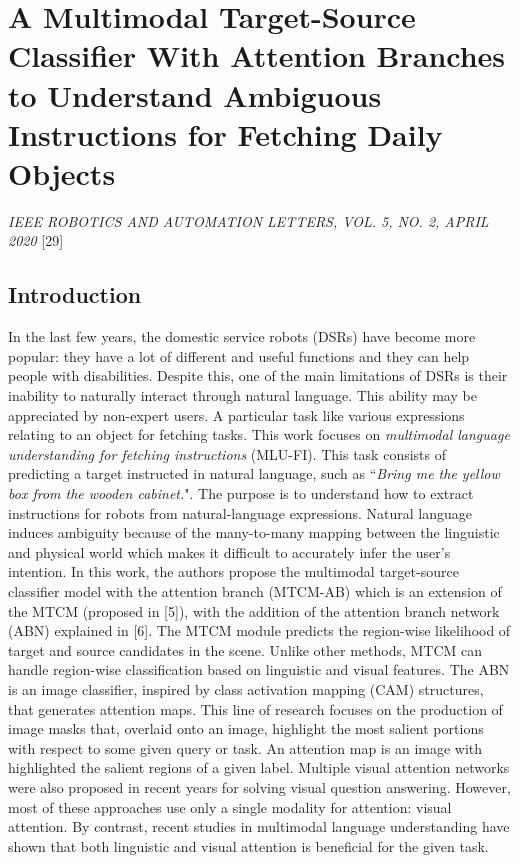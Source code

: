 \section{A Multimodal Target-Source Classifier With Attention Branches
to Understand Ambiguous Instructions for Fetching Daily
Objects}\label{header-n258}

\emph{IEEE ROBOTICS AND AUTOMATION LETTERS, VOL. 5, NO. 2, APRIL 2020}
{[}29{]}

\subsection{Introduction}\label{header-n260}

In the last few years, the domestic service robots (DSRs) have become
more popular: they have a lot of different and useful functions and they
can help people with disabilities. Despite this, one of the main
limitations of DSRs is their inability to naturally interact through
natural language. This ability may be appreciated by non-expert users. A
particular task like various expressions relating to an object for
fetching tasks. This work focuses on \emph{multimodal language
understanding for fetching instructions} (MLU-FI). This task consists of
predicting a target instructed in natural language, such as ``\emph{Bring
me the yellow box from the wooden cabinet.}". The purpose is to
understand how to extract instructions for robots from natural-language
expressions. Natural language induces ambiguity because of the
many-to-many mapping between the linguistic and physical world which
makes it difficult to accurately infer the user's intention. In this
work, the authors propose the multimodal target-source classifier model
with the attention branch (MTCM-AB) which is an extension of the MTCM
(proposed in {[}5{]}), with the addition of the attention branch network
(ABN) explained in {[}6{]}. The MTCM module predicts the region-wise
likelihood of target and source candidates in the scene. Unlike other
methods, MTCM can handle region-wise classification based on linguistic
and visual features. The ABN is an image classifier, inspired by class
activation mapping (CAM) structures, that generates attention maps. This
line of research focuses on the production of image masks that, overlaid
onto an image, highlight the most salient portions with respect to some
given query or task. An attention map is an image with highlighted the
salient regions of a given label. Multiple visual attention networks
were also proposed in recent years for solving visual question
answering. However, most of these approaches use only a single modality
for attention: visual attention. By contrast, recent studies in
multimodal language understanding have shown that both linguistic and
visual attention is beneficial for the given task.

